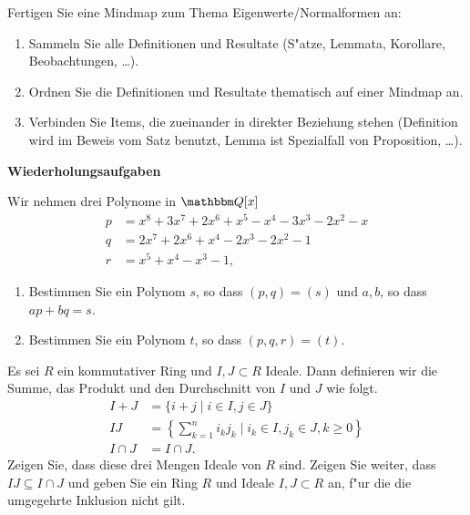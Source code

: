\documentclass[a4,11pt]{article}
\begin{document}
\begin{aufgabe}[4 Quizbonuspunkte]
  Fertigen Sie eine Mindmap zum Thema
  Eigenwerte/Normalformen an:
  \begin{enumerate}
  \item Sammeln Sie alle Definitionen und Resultate (S"atze, Lemmata,
    Korollare, Beobachtungen, \ldots).
  \item Ordnen Sie die Definitionen und Resultate thematisch auf einer
    Mindmap an.
  \item Verbinden Sie Items, die zueinander in direkter Beziehung
    stehen (Definition wird im Beweis vom Satz benutzt, Lemma ist
    Spezialfall von Proposition, \ldots).
  \end{enumerate}
\end{aufgabe}



\newpage
\bigskip
{\Large \bfseries Wiederholungsaufgaben}
\bigskip

\begin{aufgabe}
Wir nehmen drei Polynome in $\Q[x]$
\begin{align*}
p &= x^8 + 3x^7 + 2x^6 + x^5 - x^4 - 3x^3 - 2x^2 - x\\
q &= 2x^7 + 2x^6 + x^4 - 2x^3 - 2x^2 - 1\\
r &= x^5 + x^4 - x^3 - 1,
\end{align*}
\begin{enumerate}
\item
  Bestimmen Sie ein Polynom $s$, so dass $(p,q) = (s)$
  und $a,b$, so dass $ap+bq=s$.
\item
  Bestimmen Sie ein Polynom $t$, so dass $(p,q,r) = (t)$.
 \end{enumerate}
\end{aufgabe}

\begin{aufgabe}

Es sei $R$ ein kommutativer Ring und $I, J \subset R$ Ideale. Dann
definieren wir die Summe, das Produkt und den Durchschnitt von $I$ und
$J$ wie folgt.
\begin{align*}
I + J &= \{ i + j \mid i \in I, j \in J \}\\
IJ &= \left\{ \sum_{k = 1}^n i_k j_k \mid i_k \in I, j_k \in J, k \geq 0 \right\}\\
I \cap J &= I \cap J.
\end{align*}
Zeigen Sie, dass diese drei Mengen Ideale von $R$ sind. Zeigen Sie
weiter, dass $IJ \subseteq I \cap J$ und geben Sie ein Ring $R$ und
Ideale $I, J \subset R$ an, f"ur die die umgegehrte Inklusion nicht gilt.  
\end{aufgabe}
\end{document}
